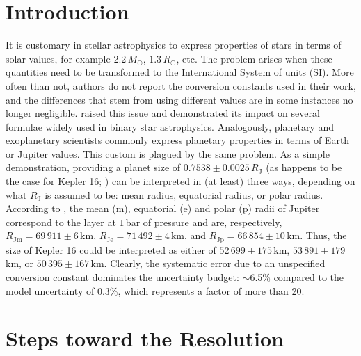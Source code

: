 \documentclass[preprint]{aastex}
\begin{document}

\section{Introduction}

It is customary in stellar astrophysics to express properties of stars in terms of solar values, for example $2.2 \, M_\odot$, $1.3 \, R_\odot$, etc. The problem arises when these quantities need to be transformed to the International System of units (SI). More often than not, authors do not report the conversion constants used in their work, and the differences that stem from using different values are in some instances no longer negligible. \citet{harmanec2011} raised this issue and demonstrated its impact on several formulae widely used in binary star astrophysics. Analogously, planetary and exoplanetary scientists commonly express planetary properties in terms of Earth or Jupiter values. This custom is plagued by the same problem. As a simple demonstration, providing a planet size of $0.7538 \pm 0.0025 \,R_\mathrm{J}$ (as happens to be the case for Kepler 16; \citealt{doyle2011}) can be interpreted in (at least) three ways, depending on what $R_\mathrm J$ is assumed to be: mean radius, equatorial radius, or polar radius. According to \citet{archinal2011}, the mean (m), equatorial (e) and polar (p) radii of Jupiter correspond to the layer at $1\,$bar of pressure and are, respectively, $R_\mathrm{Jm} = 69\,911 \pm 6$\,km, $R_\mathrm{Je} = 71\,492 \pm 4$\,km, and $R_\mathrm{Jp} = 66\,854 \pm 10$\,km. Thus, the size of Kepler 16 could be interpreted as either of $52\,699 \pm 175$\,km, $53\,891 \pm 179$\,km, or $50\,395 \pm 167$\,km. Clearly, the systematic error due to an unspecified conversion constant dominates the uncertainty budget: $\sim$6.5\% compared to the model uncertainty of 0.3\%, which represents a factor of more than 20.

\section{Steps toward the Resolution}
\end{document}
